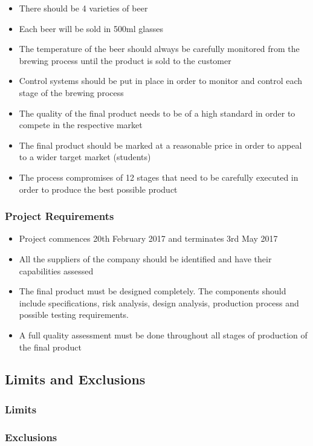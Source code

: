 \begin{itemize}
\item There should be 4 varieties of beer
\item Each beer will be sold in 500ml glasses
\item The temperature of the beer should always be carefully monitored from the brewing process until the product is sold to the customer 
\item Control systems should be put in place in order to monitor and control each stage of the brewing process 
\item The quality of the final product needs to be of a high standard in order to compete in the respective market 
\item The  final product should be marked at a reasonable price in order to appeal to a wider target market (students)
\item The process compromises of 12 stages that need to be carefully executed in order to produce the best possible product 
\end{itemize}
\subsubsection{Project Requirements}

\begin{itemize}
\item Project commences 20th February 2017 and terminates 3rd May 2017
\item All the suppliers of the company should be identified and have their capabilities assessed 
\item The final product must be designed completely. The components should include specifications, risk analysis, design analysis, production process and possible testing requirements.
\item A full quality assessment must be done throughout all stages of production of the final product
\end{itemize}

\subsection{Limits and Exclusions}
\subsubsection{Limits}
\subsubsection{Exclusions}

